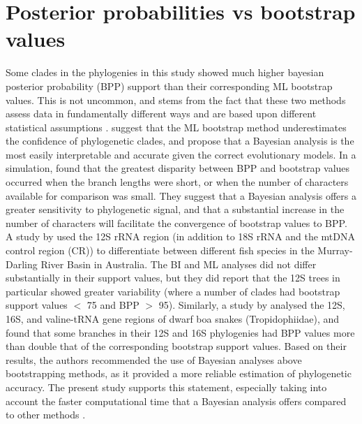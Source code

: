 \section{Posterior probabilities vs bootstrap values}

Some clades in the phylogenies in this study showed much higher bayesian posterior probability (BPP) support than their corresponding ML bootstrap values. This is not uncommon, and stems from the fact that these two methods assess data in fundamentally different ways and are based upon different statistical assumptions \citep{huelsenbeck2002potential, douady2003comparison, garcia2004comparison, huelsenbeck2004frequentist}. \citet{huelsenbeck2002potential} suggest that the ML bootstrap method underestimates the confidence of phylogenetic clades, and propose that a Bayesian analysis is the most easily interpretable and accurate given the correct evolutionary models. In a simulation, \citet{alfaro2003bayes} found that the greatest disparity between BPP and bootstrap values occurred when the branch lengths were short, or when the number of characters available for comparison was small. They suggest that a Bayesian analysis offers a greater sensitivity to phylogenetic signal, and that a substantial increase in the number of characters will facilitate the convergence of bootstrap values to BPP. \\ 
A study by \citet{hardy2011dna} used the 12S rRNA region (in addition to 18S rRNA and the mtDNA control region (CR)) to differentiate between different fish species in the Murray-Darling River Basin in Australia. The BI and ML analyses did not differ substantially in their support values, but they did report that the 12S trees in particular showed greater variability (where a number of clades had bootstrap support values $<$ 75 and BPP $>$ 95). Similarly, a study by \citet{wilcox2002phylogenetic} analysed the 12S, 16S, and valine-tRNA gene regions of dwarf boa snakes (Tropidophiidae), and found that some branches in their 12S and 16S phylogenies had BPP values more than double that of the corresponding bootstrap support values. Based on their results, the authors recommended the use of Bayesian analyses above bootstrapping methods, as it provided a more reliable estimation of phylogenetic accuracy. The present study supports this statement, especially taking into account the faster computational time that a Bayesian analysis offers compared to other methods \citep {huelsenbeck2001bayesian, douady2003comparison}.

